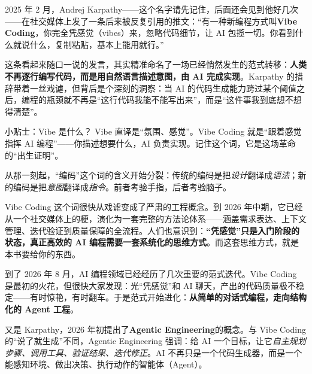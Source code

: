 


2025 年 2 月，Andrej Karpathy——这个名字请先记住，后面还会见到他好几次——在社交媒体上发了一条后来被反复引用的推文：“有一种新编程方式叫\textbf{Vibe Coding}，你完全凭感觉（vibes）来，忽略代码细节，让 AI 包揽一切。你看到什么就说什么，复制粘贴，基本上能用就行。”

这条看起来随口一说的发言，其实精准命名了一场已经悄然发生的范式转移：\textbf{人类不再逐行编写代码，而是用自然语言描述意图，由 AI 完成实现}。Karpathy 的措辞带着一丝戏谑，但背后是个深刻的洞察：当 AI 的代码生成能力跨过某个阈值之后，编程的瓶颈就不再是“这行代码我能不能写出来”，而是“这件事我到底想不想得清楚”。

\begin{tcbinfo}{小贴士：Vibe 是什么？}
Vibe 直译是“氛围、感觉”。Vibe Coding 就是“跟着感觉指挥 AI 编程”——你描述想要什么，AI 负责实现。记住这个词，它是这场革命的“出生证明”。

\end{tcbinfo}

从那一刻起，“编码”这个词的含义开始分裂：传统的编码是把\emph{设计}翻译成\emph{语法}；新的编码是把\emph{意图}翻译成\emph{指令}。前者考验手指，后者考验脑子。

Vibe Coding 这个词很快从戏谑变成了严肃的工程概念。到 2026 年中期，它已经从一个社交媒体上的梗，演化为一套完整的方法论体系——涵盖需求表达、上下文管理、迭代验证到质量保障的全流程。人们也意识到：\textbf{“凭感觉”只是入门阶段的状态，真正高效的 AI 编程需要一套系统化的思维方式}。而这套思维方式，就是本书要给你的东西。


到了 2026 年 8 月，AI 编程领域已经经历了几次重要的范式迭代。Vibe Coding 是最初的火花，但很快大家发现：光“凭感觉”和 AI 聊天，产出的代码质量极不稳定——有时惊艳，有时翻车。于是范式开始进化：\textbf{从简单的对话式编程，走向结构化的 Agent 工程}。

又是 Karpathy，2026 年初提出了\textbf{Agentic Engineering}的概念。与 Vibe Coding 的“说了就生成”不同，Agentic Engineering 强调：给 AI 一个目标，让它\emph{自主规划步骤、调用工具、验证结果、迭代修正}。AI 不再只是一个代码生成器，而是一个能感知环境、做出决策、执行动作的智能体（Agent）。

